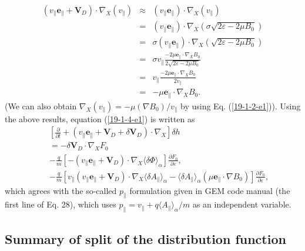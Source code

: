 \documentclass{llncs}
\begin{document}
\begin{eqnarray}
  (v_{\parallel} \mathbf{e}_{\parallel} +\mathbf{V}_D) \cdot \nabla_X
  (v_{\parallel}) & \approx & (v_{\parallel} \mathbf{e}_{\parallel}) \cdot
  \nabla_X (v_{\parallel}) \nonumber\\
  & = & (v_{\parallel} \mathbf{e}_{\parallel}) \cdot \nabla_X \left( \sigma
  \sqrt{2 \varepsilon - 2 \mu B_0} \right) \nonumber\\
  & = & \sigma (v_{\parallel} \mathbf{e}_{\parallel}) \cdot \nabla_X \left(
  \sqrt{2 \varepsilon - 2 \mu B_0} \right) \nonumber\\
  & = & \sigma v_{\parallel} \frac{- 2 \mu \mathbf{e}_{\parallel} \cdot
  \nabla_X B_0}{2 \sqrt{2 \varepsilon - 2 \mu B_0}} \nonumber\\
  & = & v_{\parallel} \frac{- 2 \mu \mathbf{e}_{\parallel} \cdot \nabla_X
  B_0}{2 v_{\parallel}} \nonumber\\
  & = & - \mu \mathbf{e}_{\parallel} \cdot \nabla_X B_0 . 
\end{eqnarray}
(We can also obtain $\nabla_X (v_{\parallel}) = - \mu (\nabla B_0) /
v_{\parallel}$ by using Eq. (\ref{19-1-2-e1})). Using the above results,
equation (\ref{19-1-4-e1}) is written as
\begin{eqnarray}
  &  & \left[ \frac{\partial}{\partial t} + (v_{\parallel}
  \mathbf{e}_{\parallel} +\mathbf{V}_D + \delta \mathbf{V}_D) \cdot \nabla_X
  \right] \delta h \nonumber\\
  &  & = - \delta \mathbf{V}_D \cdot \nabla_X F_0 \nonumber\\
  &  & - \frac{q}{m} [- (v_{\parallel} \mathbf{e}_{\parallel} +\mathbf{V}_D)
  \cdot \nabla_X \langle \delta \Phi \rangle_{\alpha}] \frac{\partial
  F_0}{\partial \varepsilon}, \nonumber\\
  &  & - \frac{q}{m} [v_{\parallel} (v_{\parallel} \mathbf{e}_{\parallel}
  +\mathbf{V}_D) \cdot \nabla_X \langle \delta A_{\parallel} \rangle_{\alpha}
  - \langle \delta A_{\parallel} \rangle_{\alpha} (\mu \mathbf{e}_{\parallel}
  \cdot \nabla B_0)] \frac{\partial F_0}{\partial \varepsilon}, 
  \label{19-1-4-5}
\end{eqnarray}
which agrees with the so-called $p_{\parallel}$ formulation given in GEM code
manual (the first line of Eq. 28), which uses $p_{\parallel} = v_{\parallel} +
q \langle A_{\parallel} \rangle_{\alpha} / m$ as an independent variable.

\subsection{Summary of split of the distribution function}
\end{document}
